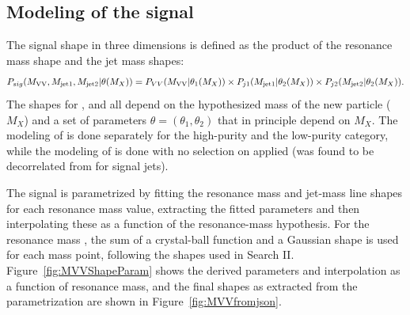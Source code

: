 \subsection{Modeling of the signal}
The signal shape in three dimensions is defined as the product of the resonance mass shape and the jet mass shapes:
\begin{equation}
	\footnotesize
	P_{sig}(M_{\rm VV},M_{\rm jet1},M_{\rm jet2}|\theta(M_X) ) = P_{VV}(M_{\rm VV}|\theta_1(M_X)) \times P_{j1}(M_{\rm jet1}|\theta_2(M_X))\\ \times P_{j2}(M_{\rm jet2}|\theta_2(M_X)).
\end{equation} 
The shapes for \MVV, \MJO and \MJT all depend on the hypothesized mass of the new particle ($M_X$) and a set of parameters $\theta=(\theta_1, \theta_2)$ that in principle depend on $M_X$. The modeling of \MJ is done separately for the high-purity and the low-purity category, while the modeling of \MVV is done with no selection on \ddt applied (\MVV was found to be decorrelated from \ddt for signal jets).\par
The signal is parametrized by fitting the resonance mass and jet-mass line shapes for each resonance mass value, extracting the fitted parameters and then interpolating these as a function of the resonance-mass hypothesis. For the resonance mass \MVV, the sum of a crystal-ball function and a Gaussian shape is used for each mass point, following the shapes used in Search II. Figure~\ref{fig:MVVShapeParam} shows the derived parameters and interpolation as a function of resonance mass, and the final \MVV shapes as extracted from the parametrization are shown in Figure~\ref{fig:MVVfromjson}.
